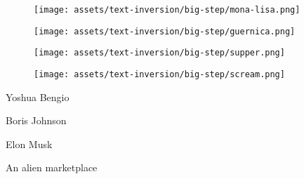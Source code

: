 \begin{figure*}[h]
\vspace{0.5ex}
\begin{minipage}[t]{0.98\figwidth}
    \vspace{0pt}
    \begin{subfigure}[t]{0.25\columnwidth}
        \texttt{[image: assets/text-inversion/big-step/mona-lisa.png]}
    \end{subfigure}%
    \begin{subfigure}[t]{0.25\columnwidth}
        \texttt{[image: assets/text-inversion/big-step/guernica.png]}
    \end{subfigure}%
    \begin{subfigure}[t]{0.25\columnwidth}
        \texttt{[image: assets/text-inversion/big-step/supper.png]}
    \end{subfigure}%
    \begin{subfigure}[t]{0.25\columnwidth}
        \texttt{[image: assets/text-inversion/big-step/scream.png]}
    \end{subfigure}%
\end{minipage}

\vspace{1ex}
\begin{minipage}[t]{0.98\figwidth}
    \vspace{2mm}
    \begin{minipage}[t]{0.25\columnwidth}
        \centering
        Yoshua Bengio
    \end{minipage}%
    \begin{minipage}[t]{0.25\columnwidth}
        \centering
        Boris Johnson
    \end{minipage}%
    \begin{minipage}[t]{0.25\columnwidth}
        \centering
        Elon Musk
    \end{minipage}%
    \begin{minipage}[t]{0.25\columnwidth}
        \centering
        An alien marketplace
    \end{minipage}%
\end{minipage}


\end{figure*}
